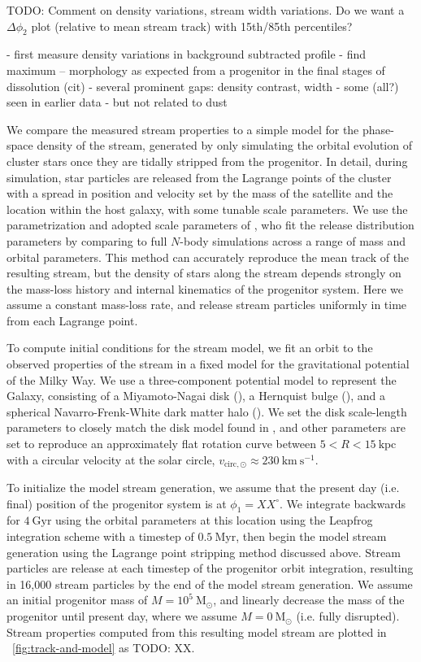 \documentclass[modern]{aastex62}
\newcommand{\msun}{\textrm{M}_\odot}
\newcommand{\kpc}{\textrm{kpc}}
\newcommand{\kms}{\ensuremath{\textrm{km}~\textrm{s}^{-1}}}
\newcommand{\todo}[1]{{\color{red} TODO: #1}}
\begin{document}
\todo{Comment on density variations, stream width variations. Do we want a
$\Delta \phi_2$ plot (relative to mean stream track) with 15th/85th
percentiles?}

- first measure density variations in background subtracted profile
- find maximum -- morphology as expected from a progenitor in the final stages of dissolution (cit)
- several prominent gaps: density contrast, width
- some (all?) seen in earlier data
- but not related to dust

We compare the measured stream properties to a simple model for the phase-space
density of the stream, generated by only simulating the orbital evolution of
cluster stars once they are tidally stripped from the progenitor.
In detail, during simulation, star particles are released from the Lagrange
points of the cluster with a spread in position and velocity set by the mass of
the satellite and the location within the host galaxy, with some tunable scale
parameters.
We use the parametrization and adopted scale parameters of \citet{Fardal:2015},
who fit the release distribution parameters by comparing to full $N$-body
simulations across a range of mass and orbital parameters.
This method can accurately reproduce the mean track of the resulting stream, but
the density of stars along the stream depends strongly on the mass-loss history
and internal kinematics of the progenitor system.
Here we assume a constant mass-loss rate, and release stream particles uniformly
in time from each Lagrange point.

To compute initial conditions for the stream model, we fit an orbit to the
observed properties of the stream in a fixed model for the gravitational
potential of the Milky Way.
We use a three-component potential model to represent the Galaxy, consisting of
a Miyamoto-Nagai disk (\citealt{Miyamoto:1975}), a Hernquist bulge
(\citealt{Hernquist:1990}), and a spherical Navarro-Frenk-White dark matter halo
(\citealt{Navarro:1996}).
We set the disk scale-length parameters to closely match the disk model found in
\citet{Bovy:2015}, and other parameters are set to reproduce an approximately
flat rotation curve between $5 < R < 15~\kpc$ with a circular velocity at the
solar circle, $v_{\textrm{circ}, \odot} \approx 230~\kms$.

To initialize the model stream generation, we assume that the present day (i.e.
final) position of the progenitor system is at $\phi_1 = XX^\circ$.
We integrate backwards for $4~\textrm{Gyr}$ using the orbital parameters at this
location using the Leapfrog integration scheme with a timestep of
$0.5~\textrm{Myr}$, then begin the model stream generation using the Lagrange
point stripping method discussed above.
Stream particles are release at each timestep of the progenitor orbit
integration, resulting in 16,000 stream particles by the end of the model stream
generation.
We assume an initial progenitor mass of $M=10^5~\msun$, and linearly decrease
the mass of the progenitor until present day, where we assume $M = 0~\msun$
(i.e. fully disrupted).
Stream properties computed from this resulting model stream are plotted in
\figurename~\ref{fig:track-and-model} as \todo{XX}.
\end{document}
